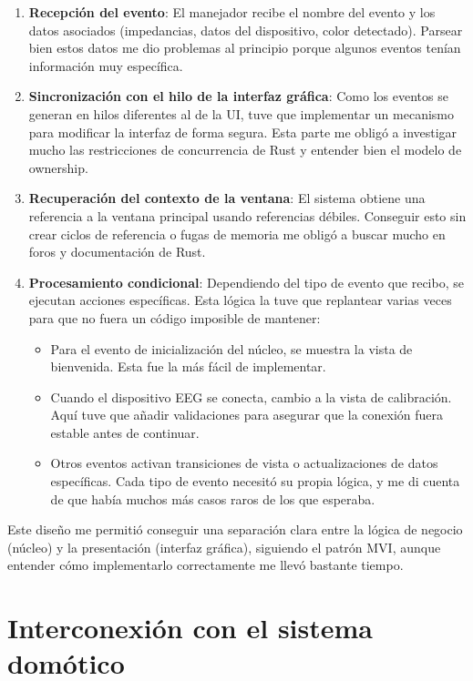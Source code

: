 \begin{enumerate}
    \item \textbf{Recepción del evento}: El manejador recibe el nombre del evento y los datos asociados (impedancias, datos del dispositivo, color detectado). Parsear bien estos datos me dio problemas al principio porque algunos eventos tenían información muy específica.
    
    \item \textbf{Sincronización con el hilo de la interfaz gráfica}: Como los eventos se generan en hilos diferentes al de la UI, tuve que implementar un mecanismo para modificar la interfaz de forma segura. Esta parte me obligó a investigar mucho las restricciones de concurrencia de Rust y entender bien el modelo de ownership.
    
    \item \textbf{Recuperación del contexto de la ventana}: El sistema obtiene una referencia a la ventana principal usando referencias débiles. Conseguir esto sin crear ciclos de referencia o fugas de memoria me obligó a buscar mucho en foros y documentación de Rust.
    
    \item \textbf{Procesamiento condicional}: Dependiendo del tipo de evento que recibo, se ejecutan acciones específicas. Esta lógica la tuve que replantear varias veces para que no fuera un código imposible de mantener:
    \begin{itemize}
        \item Para el evento de inicialización del núcleo, se muestra la vista de bienvenida. Esta fue la más fácil de implementar.
        \item Cuando el dispositivo EEG se conecta, cambio a la vista de calibración. Aquí tuve que añadir validaciones para asegurar que la conexión fuera estable antes de continuar.
        \item Otros eventos activan transiciones de vista o actualizaciones de datos específicas. Cada tipo de evento necesitó su propia lógica, y me di cuenta de que había muchos más casos raros de los que esperaba.
    \end{itemize}
\end{enumerate}

Este diseño me permitió conseguir una separación clara entre la lógica de negocio (núcleo) y la presentación (interfaz gráfica), siguiendo el patrón MVI, aunque entender cómo implementarlo correctamente me llevó bastante tiempo.

\section{Interconexión con el sistema domótico}

